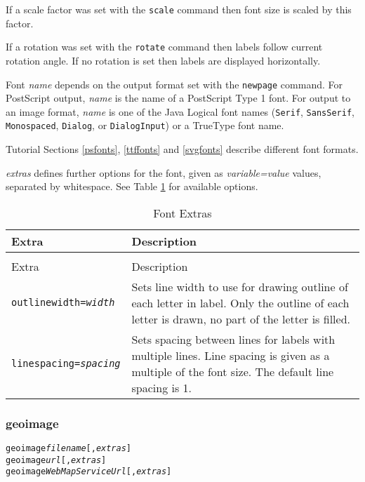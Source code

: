 If a scale factor was set with the
\texttt{scale} command
then font size is scaled by this factor.

If a rotation was set with the
\texttt{rotate} command
then labels follow current rotation angle.
If no rotation is set then labels are displayed
horizontally.

Font \textit{name}
depends on the output format set with the
\texttt{newpage} command.
For PostScript output, \textit{name} is the name of a PostScript Type 1
font.
For output to an image format, \textit{name} is one of the Java Logical
font names (\texttt{Serif}, \texttt{SansSerif},
\texttt{Monospaced}, \texttt{Dialog}, or \texttt{DialogInput}) or a TrueType
font name.

Tutorial Sections \ref{psfonts}, \ref{ttffonts} and \ref{svgfonts}
describe different font formats.

\textit{extras} defines further options for the font, given as
\textit{variable=value} values, separated by whitespace.
See Table \ref{fontextras}
for available options.

\begin{longtable}{|l|p{7cm}|}
\hline
\label{fontextras}
Extra & Description \\
\hline
\hline
\endfirsthead
\hline
\caption{Font Extras} \\
\endfoot

\hline
Extra & Description \\
\hline
\hline
\endhead

\texttt{outlinewidth=\textit{width}} &

Sets line width to use for drawing outline of each letter in label.
Only the outline of each letter is drawn, no part of the letter is filled. \\

\texttt{linespacing=\textit{spacing}} &

Sets spacing between lines for labels with multiple lines.
Line spacing is given as a multiple of the font size.
The default line spacing is 1. \\

\hline
\end{longtable}

\subsubsection{geoimage}

\begin{alltt}
geoimage \textit{filename} [, \textit{extras} ]
geoimage \textit{url} [, \textit{extras} ]
geoimage \textit{WebMapServiceUrl} [, \textit{extras} ]
\end{alltt}

